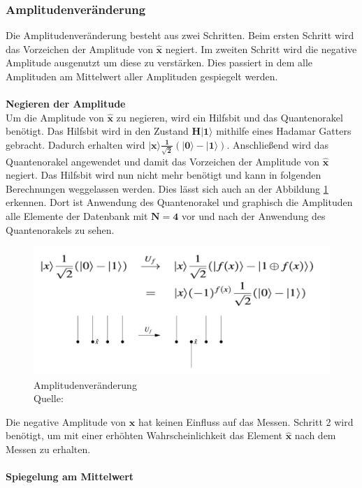 \subsubsection{Amplitudenveränderung}
Die Amplitudenveränderung besteht aus zwei Schritten. Beim ersten Schritt wird das Vorzeichen der Amplitude von $\mathbf{\hat x}$ negiert. Im zweiten Schritt wird die negative Amplitude ausgenutzt um diese zu verstärken. Dies passiert in dem alle Amplituden am Mittelwert aller Amplituden gespiegelt werden. 
\\ \\
\textbf{Negieren der Amplitude}
 \\
Um die Amplitude von $\mathbf{\hat x}$ zu negieren, wird ein Hilfsbit und das Quantenorakel benötigt. Das Hilfsbit wird in den Zustand $\mathbf{H|1\rangle}$ mithilfe eines Hadamar Gatters gebracht. Dadurch erhalten wird $\mathbf{|x\rangle \frac{1}{\sqrt 2}(|0\rangle - |1\rangle )}$. Anschließend wird das Quantenorakel angewendet und damit das Vorzeichen der Amplitude von $\mathbf{\hat{x}}$ negiert. Das Hilfsbit wird nun nicht mehr benötigt und kann in folgenden Berechnungen weggelassen werden. Dies lässt sich auch an der Abbildung \ref{fig:changeAmplitude} erkennen. Dort ist Anwendung des Quantenorakel und graphisch die Amplituden alle Elemente der Datenbank mit $\mathbf{N=4}$ vor und nach der Anwendung des Quantenorakels zu sehen.
\begin{figure}[hbtp]
	\centering
	\includegraphics[width=.8\textwidth]{figures/amplitudenveraenderung.png}
	\caption{Amplitudenveränderung \\ Quelle: \cite[S. 141]{Ho17}}
	\label{fig:changeAmplitude}
\end{figure}
Die negative Amplitude von $\mathbf{\hat x}$ hat keinen Einfluss auf das Messen. Schritt 2 wird benötigt, um mit einer erhöhten Wahrscheinlichkeit das Element $\mathbf{\hat x}$ nach dem Messen zu erhalten.
\\\\
\textbf{Spiegelung am Mittelwert} \\
\label{sec:spiegelnAmMittelwert} 
